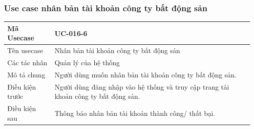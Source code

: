 \documentclass[12pt,a4paper]{article}
\begin{document}
    \subsubsection*{Use case nhân bản tài khoản công ty bất động sản }
    \begin{table}[H]
        \centering
        \begin{tabular}{|p{3.5cm}|p{11.5cm}|c|}
            \hline
            Mã Usecase      & UC-016-6                                                                            \\
            \hline
            Tên usecase     & Nhân bản tài khoản công ty bất động sản                                             \\
            \hline
            Các tác nhân    & Quản lý của hệ thống                                                                \\
            \hline
            Mô tả chung     & Người dùng muốn nhân bản tài khoản công ty bất động sản.                            \\
            \hline

            Điều kiện trước & Người dùng đăng nhập vào hệ thống và truy cập trang tài khoản công ty bất động sản. \\
            \hline

            Điều kiện sau   & Thông báo nhân bản tài khoản thành công/ thất bại.                                  \\
            \hline


\end{tabular}
\end{table}
\end{document}
